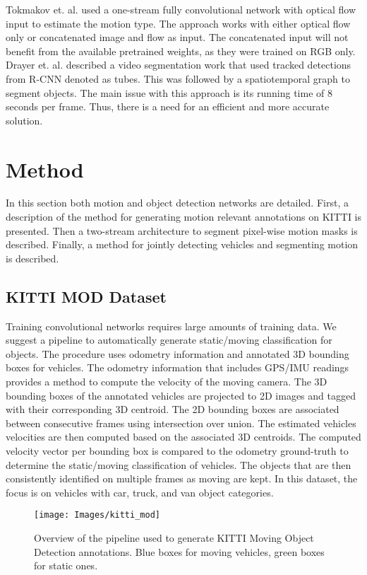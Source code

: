 \documentclass[letterpaper, 10 pt, conference]{ieeeconf}  %
\begin{document}
Tokmakov et. al. \cite{tokmakov2016learning} used a one-stream fully convolutional network with optical flow input to estimate the motion type. The approach works with either optical flow only or concatenated image and flow as input. The concatenated input will not benefit from the available pretrained weights, as they were trained on RGB only. Drayer et. al. \cite{drayer2016object} described a video segmentation work that used tracked detections from R-CNN denoted as tubes. This was followed by a spatiotemporal graph to segment objects. The main issue with this approach is its running time of 8 seconds per frame. Thus, there is a need for an efficient and more accurate solution. 

\section{Method}
\label{sec:method}
In this section both motion and object detection networks are detailed. First, a description of the method for generating motion relevant annotations on KITTI is presented. Then a two-stream architecture to segment pixel-wise motion masks is described. Finally, a method for jointly detecting vehicles and segmenting motion is described. 

\subsection{KITTI MOD Dataset}
Training convolutional networks requires large amounts of training data. We suggest a pipeline to automatically generate static/moving classification for objects. The procedure uses odometry information and annotated 3D bounding boxes for vehicles. The odometry information that includes GPS/IMU readings provides a method to compute the velocity of the moving camera. The 3D bounding boxes of the annotated vehicles are projected to 2D images and tagged with their corresponding 3D centroid. The 2D bounding boxes are associated between consecutive frames using intersection over union. The estimated vehicles velocities are then computed based on the associated 3D centroids. The computed velocity vector per bounding box is compared to the odometry ground-truth to determine the static/moving classification of vehicles. The objects that are then consistently identified on multiple frames as moving are kept. In this dataset, the focus is on vehicles with car, truck, and van object categories. 
\begin{figure}[h!]
    \texttt{[image: Images/kitti\_mod]}
    \caption{Overview of the pipeline used to generate KITTI Moving Object Detection annotations. Blue boxes for moving vehicles, green boxes for static ones.}
    \label{fig:kittimod}
\end{figure}
\end{document}
